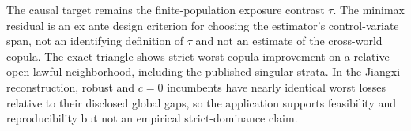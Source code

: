 The causal target remains the finite-population exposure contrast \(\tau\).  The minimax residual is an ex ante design criterion for choosing the estimator's control-variate span, not an identifying definition of \(\tau\) and not an estimate of the cross-world copula.  The exact triangle shows strict worst-copula improvement on a relative-open lawful neighborhood, including the published singular strata.  In the Jiangxi reconstruction, robust and \(c=0\) incumbents have nearly identical worst losses relative to their disclosed global gaps, so the application supports feasibility and reproducibility but not an empirical strict-dominance claim.